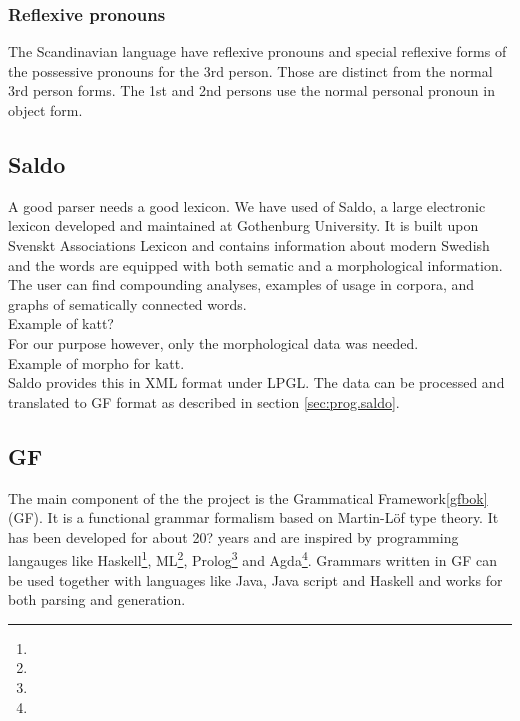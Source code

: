\documentclass{report}
\begin{document}
\subsubsection*{Reflexive pronouns}
The Scandinavian language have reflexive pronouns\cite{H&H310}
and special reflexive forms of the possessive pronouns for the 3rd
person\cite{H&H319}. Those are distinct from the normal 3rd person forms.
The 1st and 2nd persons use the normal personal pronoun in object form.



\subsection{Saldo}
A good parser needs a good lexicon. We have used of Saldo\cite{saldo}, a
large electronic lexicon developed and maintained at Gothenburg University. It is
built upon Svenskt Associations Lexicon and contains information about modern
Swedish and the words are equipped with both sematic and a morphological
information. The user can find compounding analyses, examples of usage in corpora,
and graphs of sematically connected words.\\
Example of katt? \\
For our purpose however, only the morphological data was needed.\\
Example of morpho for katt.\\
Saldo provides this in XML format under LPGL. The data can be processed and
translated to GF format as described in 
section \ref{sec:prog.saldo}.


\subsection{GF}
The main component of the the project is the Grammatical Framework\ref{gfbok} (GF). It is
a functional grammar formalism based on Martin-Löf type theory.
It has been developed for about 20? years and are inspired by programming langauges
like Haskell\footnote{}, ML\footnote{}, Prolog\footnote{} and Agda\footnote{}. Grammars written in GF can be used together with languages 
like Java, Java script and Haskell and works for both parsing and generation.
\end{document}
